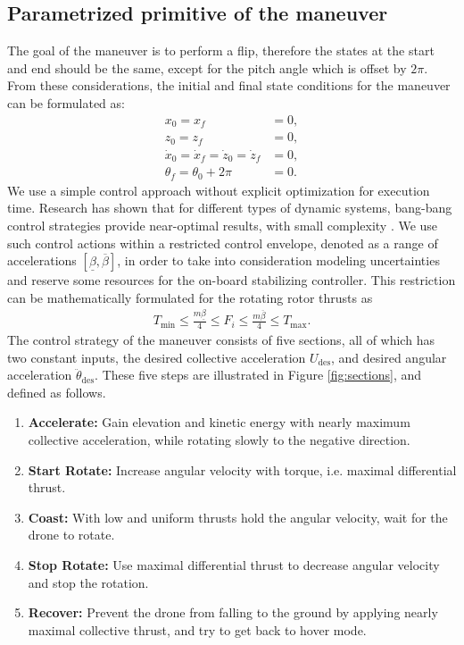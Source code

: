 \subsection{Parametrized primitive of the maneuver}\label{sec:sections}
The goal of the maneuver is to perform a flip, therefore the states at the start and end should be the same, except for the pitch angle which is offset by $2\pi$. From these considerations, the initial and final state conditions for the maneuver can be formulated as:
\begin{subequations}
\begin{align}
x_0 = x_f &= 0,\\
z_0 = z_f &= 0,\\
\dot{x}_0 = \dot{x}_f = \dot{z}_0 = \dot{z}_f &= 0,\\
\theta_f = \theta_0 + 2\pi &= 0.
\end{align}
\end{subequations}
We use a simple control approach without explicit optimization for execution time. Research has shown that for different types of dynamic systems, bang-bang control strategies provide near-optimal results, with small complexity \cite{KALMARNAGY2004,tdk2019}. We use such control actions within a restricted control envelope, denoted as a range of accelerations $[\underline{\beta},\overline{\beta}]$, in order to take into consideration modeling uncertainties and reserve some resources for the on-board stabilizing controller. This restriction can be mathematically formulated for the rotating rotor thrusts as
\begin{align}
T_\mathrm{min} \leq \frac{m\underline{\beta}}{4}\leq F_{i} \leq\frac{m\overline{\beta}}{4} \leq T_\mathrm{max}.
\end{align}
The control strategy of the maneuver consists of five sections, all of which has two constant inputs, the desired collective acceleration $U_\mathrm{des}$, and desired angular acceleration $\ddot{\theta}_\mathrm{des}$. These five steps are illustrated in Figure \ref{fig:sections}, and defined as follows.
\renewcommand{\baselinestretch}{0.85}\normalsize 
\begin{enumerate}
\item \textbf{Accelerate:} Gain elevation and kinetic energy with nearly maximum collective acceleration, while rotating slowly to the negative direction.
\item \textbf{Start Rotate:} Increase angular velocity with torque, i.e. maximal differential thrust.
\item \textbf{Coast:} With low and uniform thrusts hold the angular velocity, wait for the drone to rotate.
\item \textbf{Stop Rotate:} Use maximal differential thrust to decrease angular velocity and stop the rotation.
\item \textbf{Recover:} Prevent the drone from falling to the ground by applying nearly maximal collective thrust, and try to get back to hover mode.
\end{enumerate}
\renewcommand{\baselinestretch}{1.15}\normalsize

